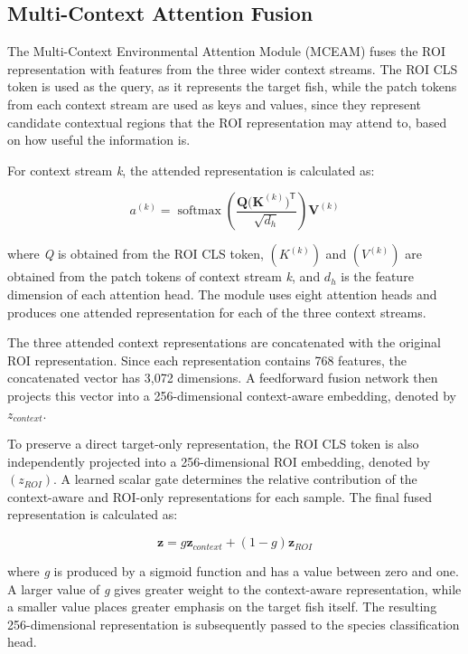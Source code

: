 \documentclass[preprint,12pt]{elsarticle}
\begin{document}
\subsection{Multi-Context Attention
Fusion}\label{multi-context-attention-fusion}

The Multi-Context Environmental Attention Module (MCEAM)
\citep{ref26} fuses the ROI representation with
features from the three wider context streams. The ROI CLS token is used
as the query, as it represents the target fish, while the patch tokens
from each context stream are used as keys and values, since they
represent candidate contextual regions that the ROI representation may
attend to, based on how useful the information is.

For context stream \emph{k}, the attended representation is calculated
as:

\begin{equation}
a^{(k)} = \operatorname{softmax}\left(\frac{\mathbf{Q}\bigl(\mathbf{K}^{(k)}\bigr)^{\mathsf{T}}}{\sqrt{d_h}}\right)\mathbf{V}^{(k)}
\label{eq:context-attention}
\end{equation}

where \emph{Q} is obtained from the ROI CLS token,
\(\left( K^{(k)} \right)\) and \(\left( V^{(k)} \right)\) are obtained
from the patch tokens of context stream \emph{k}, and \(d_{h}\) is the
feature dimension of each attention head. The module uses eight
attention heads and produces one attended representation for each of the
three context streams.

The three attended context representations are concatenated with the
original ROI representation. Since each representation contains 768
features, the concatenated vector has 3,072 dimensions. A feedforward
fusion network then projects this vector into a 256-dimensional
context-aware embedding, denoted by \(z_{context}.\)

To preserve a direct target-only representation, the ROI CLS token is
also independently projected into a 256-dimensional ROI embedding,
denoted by \(\left( z_{ROI} \right)\). A learned scalar gate determines
the relative contribution of the context-aware and ROI-only
representations for each sample. The final fused representation is
calculated as:

\begin{equation}
\mathbf{z} = g\mathbf{z}_{context} + (1-g)\mathbf{z}_{ROI}
\label{eq:gated-fusion}
\end{equation}

where \emph{g} is produced by a sigmoid function and has a value between
zero and one. A larger value of \emph{g} gives greater weight to the
context-aware representation, while a smaller value places greater
emphasis on the target fish itself. The resulting 256-dimensional
representation is subsequently passed to the species classification
head.
\end{document}

